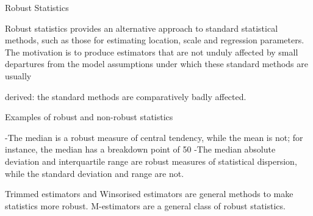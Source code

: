 

Robust Statistics

Robust statistics provides an alternative approach to standard statistical methods, 
such as those for estimating location, scale and regression parameters. 
The motivation is to produce estimators that are not unduly affected by small departures 
from the model assumptions under which these standard methods are usually 

derived: the standard methods are comparatively badly affected.

Examples of robust and non-robust statistics

 -The median is a robust measure of central tendency, while the mean is not; for instance, the median has a breakdown point of 50%
 -The median absolute deviation and interquartile range are robust measures of statistical dispersion, while the standard deviation and range are not.
 
Trimmed estimators and Winsorised estimators are general methods to make statistics more robust. M-estimators are a general class of robust statistics.






